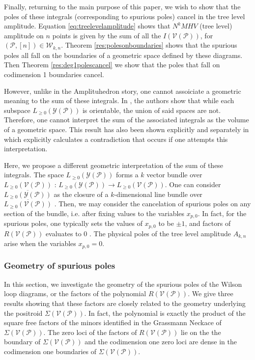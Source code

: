 \documentclass[11pt]{article}
\newcommand{\cP}{\mathcal{P}}
\newcommand{\cV}{\mathcal{V}}
\newcommand{\cY}{\mathcal{Y}}
\newcommand{\VP}{\cV(\cP)}
\newcommand{\YP}{\cY(\cP)}
\newcommand{\Lpos}{L_{\geq 0}}
\newcommand{\cW}{\mathcal{W}}
\theoremstyle{remark}
\theoremstyle{definition}
\begin{document}
Finally, returning to the main purpose of this paper, we wish to show that  the poles of these integrals (corresponding to spurious poles) cancel in the tree level amplitude. Equation \eqref{eq:treelevelamplitude} shows that $N^kMHV$ (tree level) amplitude on $n$ points is given by the sum of all the $I(\VP)$, for $(\cP, [n]) \in \cW_{k,n}$. Theorem \ref{res:polesonboundaries} shows that the spurious poles all fall on the boundaries of a geometric space defined by these diagrams. Then Theorem \ref{res:deg1polescancel} we show that the poles that fall on codimension 1 boundaries cancel.

However, unlike in the Amplituhedron story, one cannot assoiciate a geometric meaning to the sum of these integrals. In \cite{non-orientable}, the authors show that while each subspace $\Lpos(\YP)$ is orientable, the union of said spaces are not. Therefore, one cannot interpret the sum of the associated integrals as the volume of a geometric space. This result has also been shown explicitly and separately in \cite{HeslopStewart} which explicitly calculates a contradiction that occurs if one attempts this interpretation.

Here, we propose a different geometric interpretation of the sum of these integrals. The space $\Lpos(\YP)$ forms a $k$ vector bundle over $\Lpos(\VP)$ \cite{non-orientable}: $\Lpos(\YP) \rightarrow \Lpos(\VP)$. One can consider $\overline{\Lpos(\YP)}$ as the closure of a $k$-dimensional line bundle over $\overline{\Lpos(\VP)}$ \cite{non-orientable}. Then, we may consider the cancelation of spurious poles on any section of the bundle, i.e. after fixing values to the variables $x_{p, 0}$. In fact, for the spurious poles, one typically sets the values of $x_{p,0}$ to be $\pm 1$, and factors of $R(\VP)$ evaluates to $0$ \cite{casestudy, HeslopStewart, Amplituhedronsquared}. The physical poles of the tree level amplitude $A_{k,n}$ arise when the variables $x_{p, 0} = 0$. 


\subsubsection{Geometry of spurious poles}

In this section, we investigate the geometry of the spurious poles of the Wilson loop diagrams, or the factors of the polynomial $R(\VP)$. We give three results showing that these factors are closely related to the geometry underlying the positroid $\Sigma(\VP)$. In fact, the polynomial is exactly the product of the square free factors of the minors identified in the Grassmann Neckace of $\Sigma(\VP)$. The zero loci of the factors of $R(\VP)$ lie on the the boundary of $\Sigma(\VP)$ and the codimension one zero loci are dense in the codimension one boundaries of $\Sigma(\VP)$. 
\end{document}
